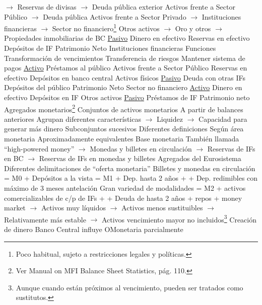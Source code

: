 \documentclass{nuevotema}
\begin{document}
\begin{esquemal}
				\4[] $\to$ Reservas de divisas
				\4[] $\to$ Deuda pública exterior
				\4[] Activos frente a Sector Público
				\4[] $\to$ Deuda pública
				\4[] Activos frente a Sector Privado
				\4[] $\to$ Instituciones financieras
				\4[] $\to$ Sector no financiero\footnote{Poco habitual, sujeto a restricciones legales y políticas.}
				\4[] Otros activos
				\4[] $\to$ Oro y otros
				\4[] $\to$ Propiedades inmobiliarias de BC
				\4[] \underline{Pasivo}
				\4[] Dinero en efectivo
				\4[] Reservas en efectivo
				\4[] Depósitos de IF
				\4[] Patrimonio Neto
			\3 Instituciones financieras
				\4 Funciones
				\4[] Transformación de vencimientos
				\4[] Transferencia de riesgos
				\4[] Mantener sistema de pagos
				\4 \underline{Activo}
				\4[] Préstamos al público
				\4[] Activos frente a Sector Público
				\4[] Reservas en efectivo
				\4[] Depósitos en banco central
				\4[] Activos físicos
				\4 \underline{Pasivo}
				\4[] Deuda con otras IFs
				\4[] Depósitos del público
				\4[] Patrimonio Neto
			\3 Sector no financiero
				\4 \underline{Activo}
				\4[] Dinero en efectivo
				\4[] Depósitos en IF
				\4[] Otros activos
				\4 \underline{Pasivo}
				\4[] Préstamos de IF
				\4[] Patrimonio neto
			\3 Agregados monetarios\footnote{Ver Manual on MFI Balance Sheet Statistics, pág. 110.}
				\4 Conjuntos de activos monetarios
				\4[] A partir de balances anteriores
				\4[] Agrupan diferentes características
				\4[] $\to$ Liquidez
				\4[] $\to$ Capacidad para generar más dinero
				\4[] Subconjuntos sucesivos
				\4 Diferentes definiciones
				\4[] Según área monetaria
				\4[] Aproximadamente equivalentes
				\4 Base monetaria
				\4[] También llamada ``high-powered money''
				\4[] $\to$ Monedas y billetes en circulación
				\4[] $\to$ Reservas de IFs en BC
				\4[] $\to$ Reservas de IFs en monedas y billetes
				\4 Agregados del Eurosistema
				\4[] Diferentes delimitaciones de ``oferta monetaria''
				\4[M0] Billetes y monedas en circulación
				\4[M1] = M0 + Depósitos a la vista
				\4[M2] = M1 + Dep. hasta 2 años +
				\4[] + Dep. redimibles con máximo de 3 meses antelación
				\4[$\to$] Gran variedad de modalidades
				\4[M3] = M2 + activos comercializables de c/p de IFs +
				\4[] + Deuda de hasta 2 años + repos + money market
				\4[] $\to$ Activos muy líquidos
				\4[] $\to$ Activos menos sustituibles
				\4[] $\to$ Relativamente más estable
				\4[] $\to$ Activos vencimiento mayor no incluidos\footnote{Aunque cuando están próximos al vencimiento, pueden ser tratados como sustitutos.}
			\3 Creación de dinero
				\4 Banco Central influye OMonetaria parcialmente

\end{esquemal}
\end{document}
